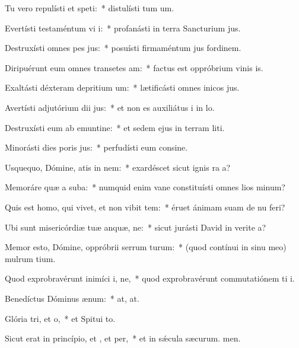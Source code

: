 \item Tu vero repulísti et speti:~* distulísti tum um.
\item Evertísti testaméntum vi i:~* profanásti in terra Sancturium jus.
\item Destruxísti omnes pes jus:~* posuísti firmaméntum jus fordinem.
\item Diripuérunt eum omnes transetes am:~* factus est oppróbrium vinis is.
\item Exaltásti déxteram depritium um:~* lætificásti omnes inicos jus.
\item Avertísti adjutórium dii jus:~* et non es auxiliátus i in lo.
\item Destruxísti eum ab emuntine:~* et sedem ejus in terram liti.
\item Minorásti dies poris jus:~* perfudísti eum consine.
\item Usquequo, Dómine, atis in nem:~* exardéscet sicut ignis ra a?
\item Memoráre quæ a suba:~* numquid enim vane constituísti omnes lios minum?
\item Quis est homo, qui vivet, et non vibit tem:~* éruet ánimam suam de nu feri?
\item Ubi sunt misericórdiæ tuæ anquæ, ne:~* sicut jurásti David in verite a?
\item Memor esto, Dómine, oppróbrii serrum turum:~* (quod contínui in sinu meo) mulrum tium.
\item Quod exprobravérunt inimíci i, ne,~* quod exprobravérunt commutatiónem ti i.
\item Benedíctus Dóminus  ænum:~* at, at.
\item Glória tri, et o,~* et Spitui to.
\item Sicut erat in princípio, et , et per,~* et in sǽcula sæcurum. men.
